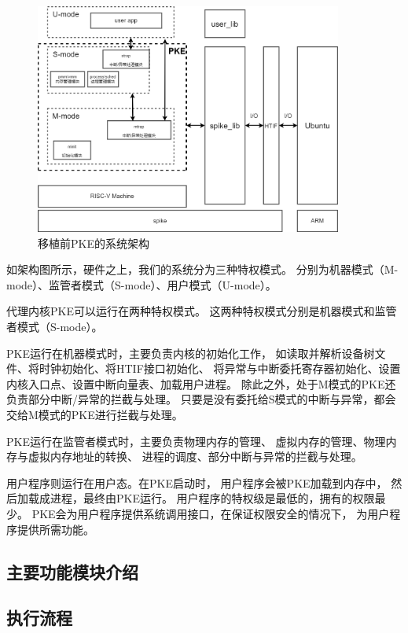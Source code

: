 \begin{figure}[htbp]
    \vspace{13pt} %
    \centering
    \includegraphics[width=0.9\textwidth]{images/before_sys_struct.drawio.png}
    \caption{移植前PKE的系统架构}\label{移植前PKE的系统架构} %
\end{figure}

如架构图所示，硬件之上，我们的系统分为三种特权模式。
分别为机器模式（M-mode）、监管者模式（S-mode）、用户模式（U-mode）。

代理内核PKE可以运行在两种特权模式。
这两种特权模式分别是机器模式和监管者模式（S-mode）。

PKE运行在机器模式时，主要负责内核的初始化工作，
如读取并解析设备树文件、将时钟初始化、将HTIF接口初始化、
将异常与中断委托寄存器初始化、设置内核入口点、设置中断向量表、加载用户进程。
除此之外，处于M模式的PKE还负责部分中断/异常的拦截与处理。
只要是没有委托给S模式的中断与异常，都会交给M模式的PKE进行拦截与处理。

PKE运行在监管者模式时，主要负责物理内存的管理、
虚拟内存的管理、物理内存与虚拟内存地址的转换、
进程的调度、部分中断与异常的拦截与处理。

用户程序则运行在用户态。在PKE启动时，
用户程序会被PKE加载到内存中，
然后加载成进程，最终由PKE运行。
用户程序的特权级是最低的，拥有的权限最少。
PKE会为用户程序提供系统调用接口，在保证权限安全的情况下，
为用户程序提供所需功能。

\subsection{主要功能模块介绍}

\subsection{执行流程}

